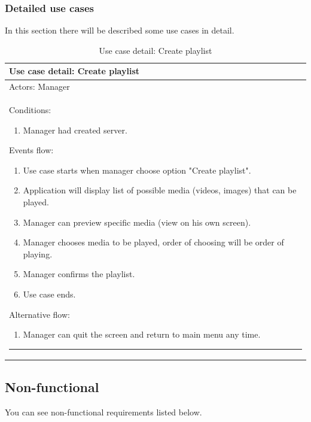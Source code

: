 \subsubsection{Detailed use cases}
In this section there will be described some use cases in detail.
\begin{table}[!h]
	\def\arraystretch{1.25}
	\caption{Use case detail: Create playlist}
	\label{tab:usecase1}
	
	\begin{tabular}{p{\textwidth}}
		\toprule
		\textbf{Use case detail: Create playlist} \\
		\midrule
		Actors: Manager \\
		Conditions:
		\begin{enumerate}
			\item Manager had created server.
		\end{enumerate}
		Events flow:
		\begin{enumerate}
			\item Use case starts when manager choose option "Create playlist".
			\item Application will display list of possible media (videos, images) that can be played.
			\item Manager can preview specific media (view on his own screen).
			\item Manager chooses media to be played, order of choosing will be order of playing.
			\item Manager confirms the playlist.
			\item Use case ends.
		\end{enumerate}
		Alternative flow:
		\begin{enumerate}
			\item Manager can quit the screen and return to main menu any time.
		\end{enumerate}
		\vspace{0.6em}
		\hrule
	\end{tabular}
\end{table}

\subsection{Non-functional}
You can see non-functional requirements listed below.

